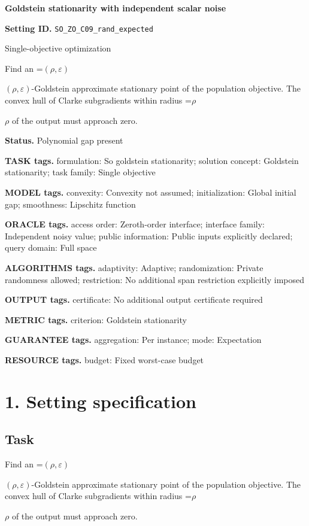 \documentclass[10pt,a4paper]{article}
\newcommand{\AtlasMath}[1]{\par\begingroup\centering\setbox0=\hbox{$\displaystyle #1$}\ifdim\wd0>1.4\linewidth\typeout{ATLAS WIDE FORMULA: \the\wd0}\fi\ifdim\wd0>\linewidth\resizebox{\linewidth}{!}{\box0}\else\box0\fi\par\endgroup}
\newcommand{\AtlasInlineMath}[1]{\begingroup\setbox0=\hbox{$#1$}\ifdim\wd0>.4\linewidth\endgroup\AtlasMath{#1}\else\endgroup$#1$\fi}
\begin{document}
\raggedright

{\LARGE\bfseries\sffamily\color{AtlasNavy} Goldstein stationarity with independent scalar noise\par}\vspace{5pt}
\textbf{Setting ID.} \texttt{SO\_\allowbreak{}ZO\_\allowbreak{}C09\_\allowbreak{}rand\_\allowbreak{}expected}

Single-objective optimization

Find an \AtlasInlineMath{(\rho,\varepsilon)}-Goldstein approximate stationary point of the population objective. The convex hull of Clarke subgradients within radius \AtlasInlineMath{\rho} of the output must approach zero.

\textbf{Status.} Polynomial gap present

\textbf{TASK tags.} formulation: So goldstein stationarity; solution concept: Goldstein stationarity; task family: Single objective

\textbf{MODEL tags.} convexity: Convexity not assumed; initialization: Global initial gap; smoothness: Lipschitz function

\textbf{ORACLE tags.} access order: Zeroth-order interface; interface family: Independent noisy value; public information: Public inputs explicitly declared; query domain: Full space

\textbf{ALGORITHMS tags.} adaptivity: Adaptive; randomization: Private randomness allowed; restriction: No additional span restriction explicitly imposed

\textbf{OUTPUT tags.} certificate: No additional output certificate required

\textbf{METRIC tags.} criterion: Goldstein stationarity

\textbf{GUARANTEE tags.} aggregation: Per instance; mode: Expectation

\textbf{RESOURCE tags.} budget: Fixed worst-case budget

\section{1. Setting specification}
\subsection{Task}
Find an \AtlasInlineMath{(\rho,\varepsilon)}-Goldstein approximate stationary point of the population objective. The convex hull of Clarke subgradients within radius \AtlasInlineMath{\rho} of the output must approach zero.
\end{document}
